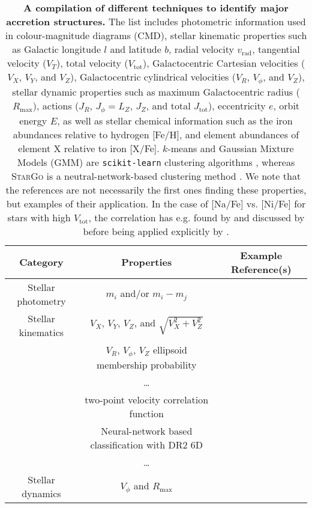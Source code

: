 \begin{table*}    \centering
    \caption{
    \textbf{A compilation of different techniques to identify major accretion structures.}
    The list includes photometric information used in colour-magnitude diagrams (CMD), stellar kinematic properties such as Galactic longitude $l$ and latitude $b$, radial velocity $v_\text{rad}$, tangential velocity ($V_T$), total velocity ($V_\text{tot}$), Galactocentric Cartesian velocities ($V_X$, $V_Y$, and $V_Z$), Galactocentric cylindrical velocities ($V_R$, $V_\phi$, and $V_Z$), stellar dynamic properties such as maximum Galactocentric radius ($R_\text{max}$), actions ($J_R$, $J_\phi = L_Z$, $J_Z$, and total $J_\text{tot}$), eccentricity $e$, orbit energy $E$, as well as stellar chemical information such as the iron abundances relative to hydrogen [Fe/H], and element abundances of element X relative to iron [X/Fe]. $k$-means and Gaussian Mixture Models (GMM) are \texttt{scikit-learn} clustering algorithms \citep{scikit-learn}, whereas \textsc{StarGo} is a neutral-network-based clustering method \citet{Yuan2018}.
    We note that the references are not necessarily the first ones finding these properties, but examples of their application. In the case of [Na/Fe] vs. [Ni/Fe] for stars with high $V_\text{tot}$, the correlation has e.g. found by \citet{Nissen1997,Nissen2010} and discussed by \citet{Venn2004} before being applied explicitly by \citet{Bensby2014}.
    }
    \begin{tabular}{c|c|c}
        \hline \hline
        Category & Properties & Example Reference(s) \\
        \hline
        Stellar photometry & $m_i$ and/or $m_i - m_j$ & \citet{Belokurov2006} \\
        \hline
        Stellar kinematics & $V_X$, $V_Y$, $V_Z$, and $\sqrt{V_X^2+V_Z^2}$ & \citet{Koppelman2018} \\
		& $V_R$, $V_\phi$, $V_Z$ ellipsoid membership probability & \citet{Carollo2010} \\
		& \dots & \citet{Ishigaki2012, Ishigaki2013} \\
		& two-point velocity correlation function & \citet{ReFiorentin2015} \\
		& Neural-network based classification with \Gaia DR2 6D & \citet{Ostdiek2020} \\
		& \dots & \citet{Necib2020} \\
        \hline
        Stellar dynamics & $V_\phi$ and $R_\text{max}$ & \citet{Gratton2003} \\

\end{tabular}
\end{table*}

